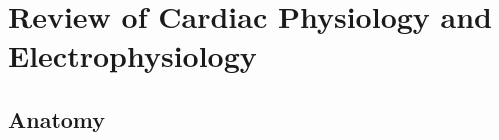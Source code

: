 
\chapter{\label{app:1-cardiophys}Review of Cardiac Physiology and Electrophysiology}

\minitoc

\section{Anatomy}
\label{sec:anatomy}
